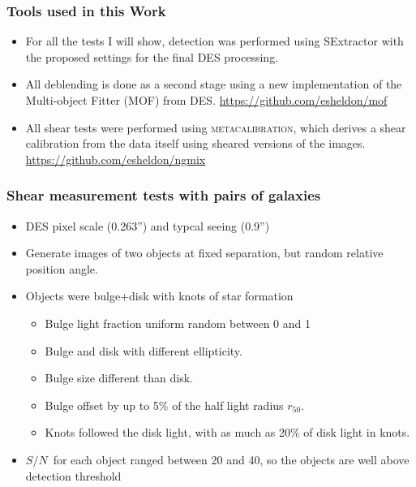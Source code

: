 \documentclass{beamer}
\newcommand{\mcal}{\textsc{metacalibration}}
\newcommand{\snr}{$S/N$}
\newcommand{\hlr}{$r_{50}$}
\begin{document}
\frame
{
    \frametitle{Tools used in this Work}

 
    \begin{itemize}

        \item For all the tests I will show, detection was performed using SExtractor
            with the proposed settings for the final DES processing.

        \item All deblending is done as a second stage using a new implementation
            of the Multi-object Fitter (MOF) from DES. \url{https://github.com/esheldon/mof}

        \item All shear tests were performed using \mcal, which derives a shear
            calibration from the data itself using sheared versions of the images.
            \url{https://github.com/esheldon/ngmix}

    \end{itemize}

}


\frame
{
    \frametitle{Shear measurement tests with pairs of galaxies}

 
    \begin{itemize}

        \item DES pixel scale (0.263'') and typcal seeing (0.9'')
        \item Generate images of two objects at fixed separation, but random
            relative position angle.

        \item Objects were bulge+disk with knots of star formation
            \begin{itemize}
                \item Bulge light fraction uniform random between 0 and 1
                \item Bulge and disk with different ellipticity.
                \item Bulge size different than disk.
                \item Bulge offset by up to 5\% of the half light radius \hlr.
                \item Knots followed the disk light, with as much as 20\%
                    of disk light in knots.
            \end{itemize}
        \item \snr\ for each object ranged between 20 and 40, so the objects
            are well above detection threshold

    \end{itemize}

}
\end{document}
